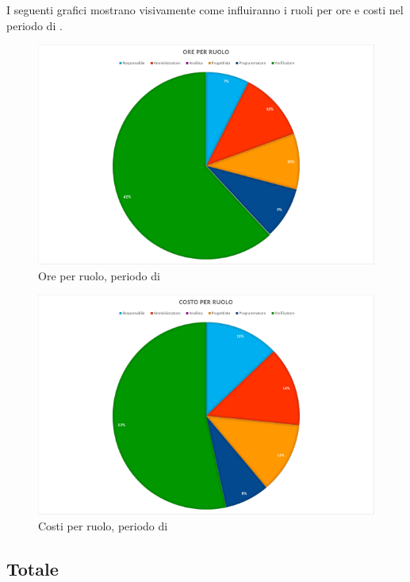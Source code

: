 I seguenti grafici mostrano visivamente come influiranno i ruoli per ore e costi nel periodo di \VV{}.
\begin{figure}[H]
	\centering
	\includegraphics[width=14cm]{img_peconomico/VV_OR.png}
	\caption{Ore per ruolo, periodo di \VV}
\end{figure}
\begin{figure}[H]
	\centering
	\includegraphics[width=14cm]{img_peconomico/VV_CR.png}
	\caption{Costi per ruolo, periodo di \VV}
\end{figure}

\subsection{Totale}
